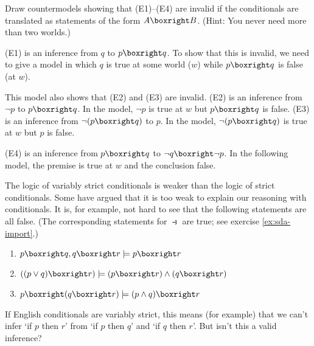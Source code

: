 \begin{exercise}
  Draw countermodels showing that (E1)--(E4) are invalid if the conditionals are
  translated as statements of the form $A \boxright B$. (Hint: You never need
  more than two worlds.)
\end{exercise}
\begin{solution}
    (E1) is an inference from $q$ to $p \boxright q$. To show that this is invalid, we need to give a model in which $q$ is true at some world ($w$) while $p \boxright q$ is false (at $w$). 
    
  
  This model also shows that (E2) and (E3) are invalid.
  (E2) is an inference from $\neg p$ to $p \boxright q$. In the model,
  $\neg p$ is true at $w$ but $p \boxright q$ is false.
  (E3) is an inference from $\neg(p \boxright q)$ to $p$. In the model,
  $\neg(p \boxright q)$ is true at $w$ but $p$ is false.

  (E4) is an inference from $p \boxright q$ to $\neg q \boxright \neg p$.
  In the following model, the premise is true at $w$ and the conclusion false.
  
\end{solution}

The logic of variably strict conditionals is weaker than the logic of strict
conditionals. Some have argued that it is too weak to explain our
reasoning with conditionals. It is, for example, not hard to see that the
following statements are all false. (The corresponding statements for
$\strictif$ are true; see exercise \ref{ex:sda-import}.)
\begin{enumerate}[leftmargin=10mm]
  \itemsep-1mm
\item $p \boxright q, q \boxright r \models p \boxright r$
\item $((p \lor q) \boxright r) \models (p \boxright r) \land (q \boxright r)$
\item $p \boxright (q \boxright r) \models (p \land q) \boxright r$
\end{enumerate}
If English conditionals are variably strict, this means (for example) that we can't 
infer `if $p$ then $r$' from `if $p$ then $q$' and `if $q$ then $r$'. But isn't
this a valid inference?

